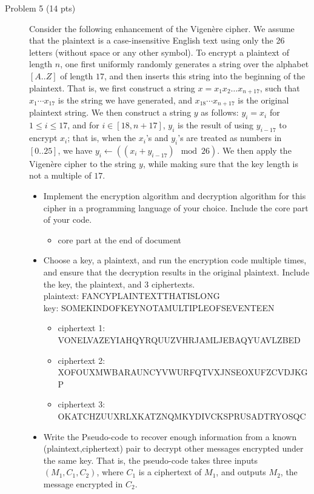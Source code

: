 \documentclass[11pt]{article}
\begin{document}
\begin{description}
 \item[Problem 5 (14 pts)]
Consider the following enhancement of the Vigen\`{e}re cipher.  We assume that the plaintext is a case-insensitive English text using only the 26 letters (without space or any other symbol).  To encrypt a plaintext of length $n$, one first uniformly randomly generates a string over the alphabet $[A..Z]$ of length $17$, and then inserts this string into the beginning of the plaintext.  That is, we first construct a string $x=x_1x_2\ldots x_{n+17}$, such that $x_1\cdots x_{17}$ is the string we have generated, and $x_{18}\cdots x_{n+17}$ is the original plaintext string.  We then construct a string $y$ as follows: $y_i=x_i$ for $1\leq i\leq 17$, and for $i\in [18,n+17]$, $y_i$ is the result of using $y_{i-17}$ to encrypt $x_i$; that is, when the $x_i$'s and $y_i$'s are treated as numbers in $[0..25]$, we have $y_i \leftarrow ((x_i + y_{i-17}) \mod 26)$.  We then apply the Vigen\`{e}re cipher to the string $y$, while making sure that the key length is not a multiple of $17$.

\begin{itemize}
 \item
Implement the encryption algorithm and decryption algorithm for this cipher in a programming language of your choice.  Include the core part of your code.
	\begin{itemize}
	\item 
	core part at the end of document
	\end{itemize}

 \item
Choose a key, a plaintext, and run the encryption code multiple times, and ensure that the decryption results in the original plaintext. Include the key, the plaintext, and 3 ciphertexts.\\
	plaintext: FANCYPLAINTEXTTHATISLONG \\
	key: SOMEKINDOFKEYNOTAMULTIPLEOFSEVENTEEN
	\begin{itemize}
	\item 
	ciphertext 1: VONELVAZEYIAHQYRQUUZVHRJAMLJEBAQYUAVLZBED
	\item
	ciphertext 2: XOFOUXMWBARAUNCYVWURFQTVXJNSEOXUFZCVDJKGP
	\item
	ciphertext 3: OKATCHZUUXRLXKATZNQMKYDIVCKSPRUSADTRYOSQC
	\end{itemize}

 \item
Write the Pseudo-code to recover enough information from a known (plaintext,ciphertext) pair to decrypt other messages encrypted under the same key.  That is, the pseudo-code takes three inputs $(M_1,C_1,C_2)$, where $C_1$ is a ciphertext of $M_1$, and outputs $M_2$, the message encrypted in $C_2$.


\end{itemize}
\end{description}
\end{document}
